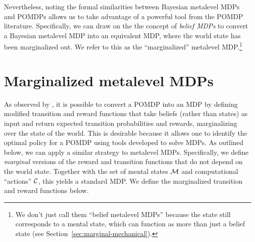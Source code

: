 
Nevertheless, noting the formal similarities between Bayesian metalevel MDPs and POMDPs allows us to take advantage of a powerful tool from the POMDP literature. Specifically, we can draw on the the concept of \emph{belief MDPs} \citep{kaelbling1998planningb} to convert a Bayesian metalevel MDP into an equivalent MDP, where the world state has been marginalized out. We refer to this as the ``marginalized'' metalevel MDP.\footnote{We don't just call them ``belief metalevel MDPs'' because the state still corresponds to a mental state, which can function as more than just a belief state (see Section~\ref{sec:marginal-mechanical}).}

\section{Marginalized metalevel MDPs}\label{sec:metamdp-marginalized}

As observed by \citet{kaelbling1998planningb}, it is possible to convert a POMDP into an MDP by defining modified transition and reward functions that take beliefs (rather than states) as input and return expected transition probabilities and rewards, marginalizing over the state of the world. This is desirable because it allows one to identify the optimal policy for a POMDP using tools developed to solve MDPs. As outlined below, we can apply a similar strategy to metalevel MDPs. Specifically, we define \emph{marginal} versions of the reward and transition functions that do not depend on the world state. Together with the set of mental states $\mathcal{M}$ and computational ``actions'' $\mathcal{C}$, this yields a standard MDP. We define the marginalized transition and reward functions below.



